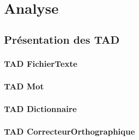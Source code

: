 \section{Analyse}
	\subsection{Présentation des TAD}
		\subsubsection{TAD FichierTexte}
			
			
		\subsubsection{TAD Mot}
			
			
		\subsubsection{TAD Dictionnaire}
			
			
		\subsubsection{TAD CorrecteurOrthographique}
			
